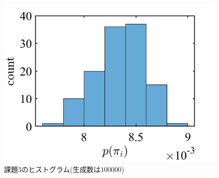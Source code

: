 \documentclass[autodetect-engine,dvipdfmx-if-dvi,ja=standard,a4paper,11pt]{bxjsarticle} %
\begin{document}
\begin{figure}[H]%
\begin{center}
\includegraphics[width=.4\textwidth]{kadai3_histo.jpg}
\end{center}
\caption{課題3のヒストグラム(生成数は$100000$)}%
\label{fig:kadai3_3}
\end{figure}












\end{document}
